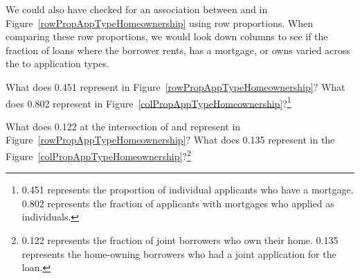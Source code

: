We could also have checked for an association between  and  in Figure~\ref{rowPropAppTypeHomeownership} using row proportions. When comparing these row proportions, we would look down columns to see if the fraction of loans where the borrower rents, has a mortgage, or owns varied across the  to  application types.


\begin{exercise}
What does 0.451 represent in Figure~\ref{rowPropAppTypeHomeownership}? What does 0.802 represent in Figure~\ref{colPropAppTypeHomeownership}?\footnote{0.451 represents the proportion of individual applicants who have a mortgage. 0.802 represents the fraction of applicants with mortgages who applied as individuals.}
\end{exercise}

\begin{exercise}
What does 0.122 at the intersection of  and  represent in Figure~\ref{rowPropAppTypeHomeownership}? What does 0.135 represent in the Figure~\ref{colPropAppTypeHomeownership}?\footnote{0.122 represents the fraction of joint borrowers who own their home. 0.135 represents the home-owning borrowers who had a joint application for the loan.}
\end{exercise}

